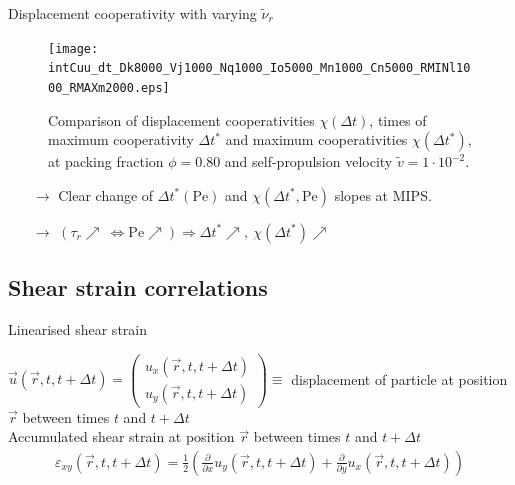 \documentclass{beamer}
\begin{document}
\begin{frame}{Displacement cooperativity with varying $\tilde{\nu}_r$}

\begin{figure}[h!]
  \centering
  \texttt{[image: intCuu\_dt\_Dk8000\_Vj1000\_Nq1000\_Io5000\_Mn1000\_Cn5000\_RMINl1000\_RMAXm2000.eps]}
  \vspace{-0.3cm}
  \caption{Comparison of displacement cooperativities $\chi(\Delta t)$, times of maximum cooperativity $\Delta t^*$ and maximum cooperativities $\chi(\Delta t^*)$, at packing fraction $\phi=0.80$ and self-propulsion velocity $\tilde{v}=1\cdot10^{-2}$.}
\end{figure}

\vspace{-0.5cm}
\begin{itemize}
  \item[$\rightarrow$] Clear change of $\Delta t^*(\text{Pe})$ and $\chi(\Delta t^*, \text{Pe})$ slopes at MIPS.
  \item[$\rightarrow$] $(\tau_r \nearrow~ \Leftrightarrow \text{Pe} \nearrow) \Rightarrow \Delta t^* \nearrow,~ \chi(\Delta t^*)\nearrow$
\end{itemize}

\end{frame}

\subsection{Shear strain correlations}

\begin{frame}{Linearised shear strain}

$\vec{u}(\vec{r}, t, t + \Delta t) = \begin{pmatrix} u_x(\vec{r}, t, t + \Delta t) \\ u_y(\vec{r}, t, t + \Delta t) \end{pmatrix} \equiv$ displacement of particle at position $\vec{r}$ between times $t$ and $t + \Delta t$\\

Accumulated shear strain at position $\vec{r}$ between times $t$ and $t  + \Delta t$
\begin{align*}
\varepsilon_{xy}(\vec{r}, t, t + \Delta t) = \frac{1}{2}\left(\frac{\partial}{\partial x}u_y(\vec{r}, t, t + \Delta t) + \frac{\partial}{\partial y}u_x(\vec{r}, t, t + \Delta t)\right)
\end{align*}

\end{frame}
\end{document}
